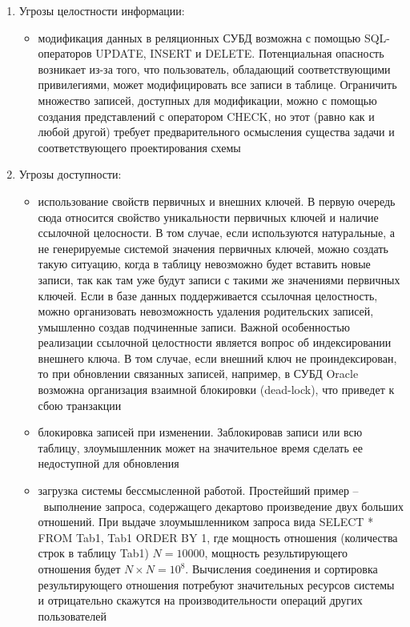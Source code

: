 \begin{enumerate}
	\item Угрозы целостности информации:
		\begin{itemize}
			\item модификация данных в реляционных СУБД возможна с помощью SQL-операторов UPDATE, INSERT и DELETE. Потенциальная опасность возникает из-за того, что пользователь, обладающий соответствующими привилегиями, может модифицировать все записи в таблице. Ограничить множество записей, доступных для модификации, можно с помощью создания представлений с оператором CHECK, но этот (равно как и любой другой) требует предварительного осмысления существа задачи и соответствующего проектирования схемы
		\end{itemize}
	\item Угрозы доступности:
		\begin{itemize}
			\item использование свойств первичных и внешних ключей. В первую очередь сюда относится свойство уникальности первичных ключей и наличие ссылочной целосности. В том случае, если используются натуральные, а не генерируемые системой значения первичных ключей, можно создать такую ситуацию, когда в таблицу невозможно будет вставить новые записи, так как там уже будут записи с такими же значениями первичных ключей. Если в базе данных поддерживается ссылочная целостность, можно организовать невозможность удаления родительских записей, умышленно создав подчиненные записи. Важной особенностью реализации ссылочной целостности является вопрос об индексировании внешнего ключа. В том случае, если внешний ключ не проиндексирован, то при обновлении связанных записей, например, в СУБД Oracle возможна организация взаимной блокировки (dead-lock), что приведет к сбою транзакции
			
			\item блокировка записей при изменении. Заблокировав записи или всю таблицу, злоумышленник может на значительное время сделать ее недоступной для обновления
			
			\item загрузка системы бессмысленной работой. Простейший пример – выполнение запроса, содержащего декартово произведение двух больших отношений. При выдаче злоумышленником запроса вида SELECT * FROM Tab1, Tab1 ORDER BY 1, где мощность отношения (количества строк в таблицу Tab1) $N = 10000$, мощность результирующего отношения будет $N \times N = 10^8$. Вычисления соединения и сортировка результирующего отношения потребуют значительных ресурсов системы и отрицательно скажутся на производительности операций других пользователей
		\end{itemize}
\end{enumerate}

